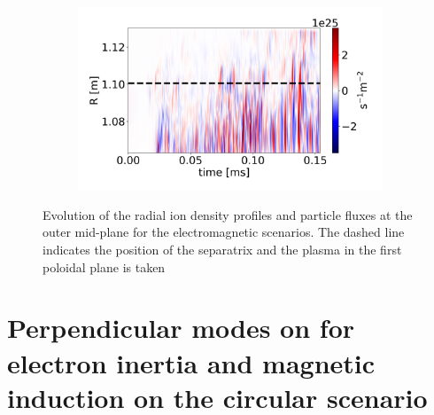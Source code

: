 \begin{figure}[H]
\begin{subfigure}[t]{0.45\textwidth}
	\end{subfigure}
	\begin{subfigure}[t]{0.45\textwidth}
		\centering
		\includegraphics[width=1\textwidth]{schemes/plotOMPtime_spec1_fluxn_psi_flutter.jpg}
	\end{subfigure}
	\caption{Evolution of the radial ion density profiles and particle fluxes at the outer mid-plane for the electromagnetic scenarios. The dashed line indicates the position of the separatrix and the plasma in the first poloidal plane is taken}
	\label{fig:CIRC_EM_OMPevolution_n}
\end{figure}


\section{Perpendicular modes on for electron inertia and magnetic induction on the circular scenario}
\label{sec:turbulentProfiles_CIRCmodal}


